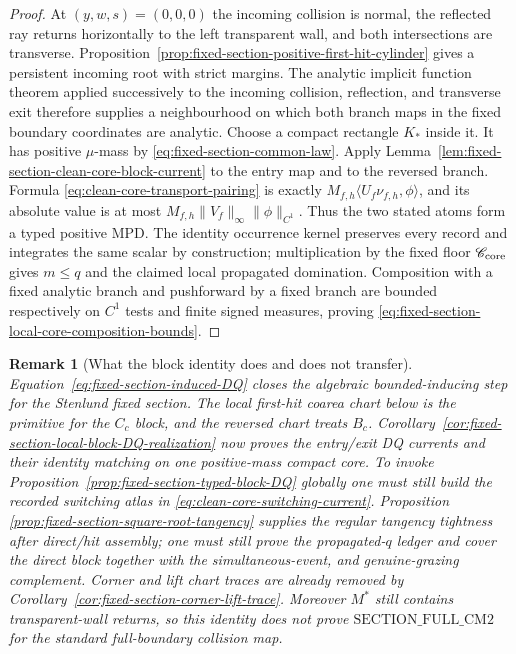 \documentclass[11pt]{article}
\newtheorem{remark}[theorem]{Remark}
\begin{document}
\begin{proof}
At $(y,w,s)=(0,0,0)$ the incoming collision is normal, the reflected ray
returns horizontally to the left transparent wall, and both intersections
are transverse.  Proposition~\ref{prop:fixed-section-positive-first-hit-cylinder}
gives a persistent incoming root with strict margins.  The analytic implicit
function theorem applied successively to the incoming collision, reflection,
and transverse exit therefore supplies a neighbourhood on which both branch
maps in the fixed boundary coordinates are analytic.  Choose a compact
rectangle $K_*$ inside it.  It has positive $\mu$-mass by
\eqref{eq:fixed-section-common-law}.  Apply
Lemma~\ref{lem:fixed-section-clean-core-block-current} to the entry map and
to the reversed branch.  Formula
\eqref{eq:clean-core-transport-pairing} is exactly
$M_{f,h}\langle U_f\nu_{f,h},\phi\rangle$, and its absolute value is at most
$M_{f,h}\|V_f\|_\infty\|\phi\|_{C^1}$.  Thus the two stated atoms form a typed
positive MPD.  The identity occurrence kernel preserves every record and
integrates the same scalar by construction; multiplication by the fixed
floor $\mathscr C_{\rm core}$ gives $m\le q$ and the claimed local
propagated domination.  Composition with a fixed analytic branch and
pushforward by a fixed branch are bounded respectively on $C^1$ tests and
finite signed measures, proving
\eqref{eq:fixed-section-local-core-composition-bounds}.
\end{proof}

\begin{remark}[What the block identity does and does not transfer]
\label{rem:fixed-section-block-frontier}
Equation~\eqref{eq:fixed-section-induced-DQ} closes the algebraic
bounded-inducing step for the Stenlund fixed section.  The local first-hit
coarea chart below is the primitive for the $C_c$ block, and the reversed
chart treats $B_c$.  Corollary~\ref{cor:fixed-section-local-block-DQ-realization}
now proves the entry/exit DQ currents and their identity matching on one
positive-mass compact core.  To invoke
Proposition~\ref{prop:fixed-section-typed-block-DQ} globally one must still
build the recorded switching atlas in
\eqref{eq:clean-core-switching-current}.  Proposition~
\ref{prop:fixed-section-square-root-tangency} supplies the regular tangency
tightness after direct/hit assembly; one must still prove the propagated-$q$
ledger and cover the direct block together with the simultaneous-event,
and genuine-grazing complement.  Corner and lift chart traces are already
removed by Corollary~\ref{cor:fixed-section-corner-lift-trace}.  Moreover $M^*$ still contains transparent-wall
returns, so this identity does not prove
$\mathrm{SECTION\_FULL\_CM2}$ for the standard full-boundary collision map.
\end{remark}
\end{document}
